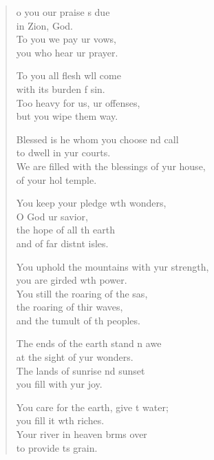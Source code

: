 \settowidth{\versewidth}{We are filled with the blessings of your house, *}
\begin{verse}%
  \begin{patverse}
    o you our praise \pointup{\i}s due\Med\\
in Zion,  God.\\
To you we pay ur vows,\Med\\
you who hear ur prayer.

To you all flesh w\pointup{\i}ll come\Med\\
with its burden f sin.\\
Too heavy for us, ur offenses,\Med\\
but you wipe them way.

Blessed is he whom you choose nd call\Med\\
to dwell in yur courts.\\
We are filled with the blessings of yur house,\Med\\
of your hol temple.

You keep your pledge w\pointup{\i}th wonders,\Med\\
O God ur savior,\\
the hope of all th earth\Med\\
and of far distnt isles.

You uphold the mountains with yur strength,\Med\\
you are girded w\pointup{\i}th power.\\
You still the roaring of the sas,\Flex\\
the roaring of thir waves,\Med\\
and the tumult of th peoples.

The ends of the earth stand \pointup{\i}n awe\Med\\
at the sight of yur wonders.\\
The lands of sunrise nd sunset\Med\\
you fill with yur joy.

You care for the earth, give \pointup{\i}t water;\Med\\
you fill it w\pointup{\i}th riches.\\
Your river in heaven br\pointup{\i}ms over\Med\\
to provide \pointup{\i}ts grain.


\end{patverse}
\end{verse}
